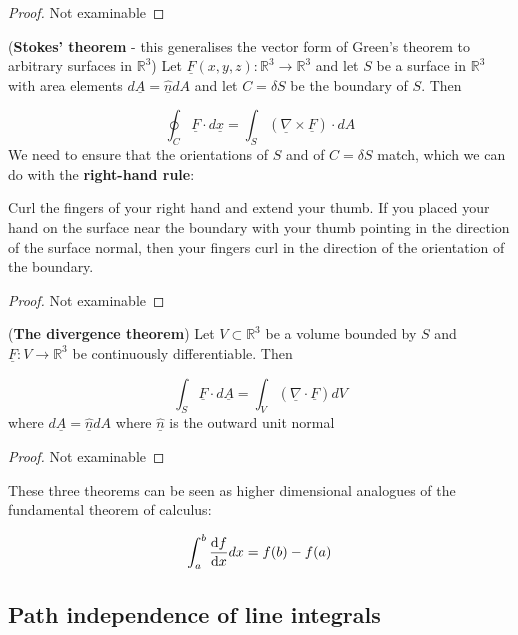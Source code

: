 \begin{proof}
	Not examinable
\end{proof}

\begin{theorem}
	(\textbf{Stokes' theorem} - this generalises the vector form of Green's theorem to arbitrary surfaces in $\mathbb{R}^3$) Let $\underline{F}(x, y, z): \mathbb{R}^3 \rightarrow \mathbb{R}^3$ and let $S$ be a surface in $\mathbb{R}^3$ with area elements $d\underline{A} = \underline{\hat{n}} dA$ and let $C = \delta S$ be the boundary of $S$. Then

	\[ \oint_C \underline{F} \cdot d\underline{x} = \int_S \left( \underline{\nabla} \times \underline{F} \right) \cdot dA \]
	We need to ensure that the orientations of $S$ and of $C = \delta S$ match, which we can do with the \textbf{right-hand rule}:

	Curl the fingers of your right hand and extend your thumb. If you placed your hand on the surface near the boundary with your thumb pointing in the direction of the surface normal, then your fingers curl in the direction of the orientation of the boundary.
\end{theorem}

\begin{proof}
	Not examinable
\end{proof}

\begin{theorem}
	(\textbf{The divergence theorem}) Let $V \subset \mathbb{R}^3$ be a volume bounded by $S$ and $\underline{F}: V \rightarrow \mathbb{R}^3$ be continuously differentiable. Then

	\[ \int_S \underline{F} \cdot d\underline{A} = \int_V \left( \underline{\nabla} \cdot \underline{F} \right) dV \]
	where $d\underline{A} = \underline{\hat{n}} dA$ where $\underline{\hat{n}}$ is the outward unit normal
\end{theorem}

\begin{proof}
	Not examinable
\end{proof}

\begin{remark}
	These three theorems can be seen as higher dimensional analogues of the fundamental theorem of calculus:

	\[ \int_a^b \diff{f}{x} dx = f(b) - f(a) \]
\end{remark}

\subsection{Path independence of line integrals}

